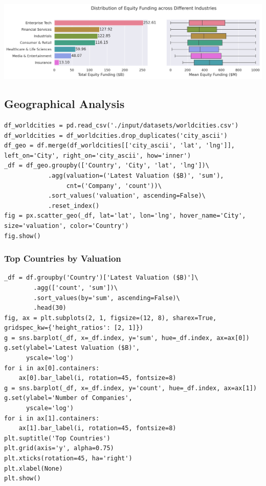 \documentclass[a4paper,12pt]{article}
\begin{document}
\begin{center}
\includegraphics[width=.9\linewidth]{./.ob-jupyter/215e6c23cbc5b3bf332aa16d0f2fb53af47c666f.png}
\label{}
\end{center}
\subsection{Geographical Analysis}
\label{sec:org2c6c647}

\begin{verbatim}
df_worldcities = pd.read_csv('./input/datasets/worldcities.csv')
df_worldcities = df_worldcities.drop_duplicates('city_ascii')
df_geo = df.merge(df_worldcities[['city_ascii', 'lat', 'lng']], left_on='City', right_on='city_ascii', how='inner')
_df = df_geo.groupby(['Country', 'City', 'lat', 'lng'])\
            .agg(valuation=('Latest Valuation ($B)', 'sum'),
                 cnt=('Company', 'count'))\
            .sort_values('valuation', ascending=False)\
            .reset_index()
fig = px.scatter_geo(_df, lat='lat', lon='lng', hover_name='City', size='valuation', color='Country')
fig.show()
\end{verbatim}
\subsubsection{Top Countries by Valuation}
\label{sec:org8cb1f6c}

\begin{verbatim}
_df = df.groupby('Country')['Latest Valuation ($B)']\
        .agg(['count', 'sum'])\
        .sort_values(by='sum', ascending=False)\
        .head(30)
fig, ax = plt.subplots(2, 1, figsize=(12, 8), sharex=True, gridspec_kw={'height_ratios': [2, 1]})
g = sns.barplot(_df, x=_df.index, y='sum', hue=_df.index, ax=ax[0])
g.set(ylabel='Latest Valuation ($B)',
      yscale='log')
for i in ax[0].containers:
    ax[0].bar_label(i, rotation=45, fontsize=8)
g = sns.barplot(_df, x=_df.index, y='count', hue=_df.index, ax=ax[1])
g.set(ylabel='Number of Companies',
      yscale='log')
for i in ax[1].containers:
    ax[1].bar_label(i, rotation=45, fontsize=8)
plt.suptitle('Top Countries')
plt.grid(axis='y', alpha=0.75)
plt.xticks(rotation=45, ha='right')
plt.xlabel(None)
plt.show()
\end{verbatim}
\end{document}
